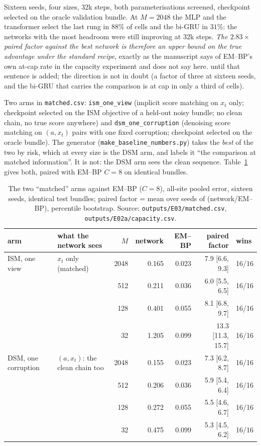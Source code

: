  Sixteen seeds, four sizes, 32k steps, both parameterisations screened, checkpoint selected on the oracle validation bundle. At $M=2048$ the MLP and the transformer select the last rung in $88\%$ of cells and the bi-GRU in $31\%$: the networks with the most headroom were still improving at 32k steps. \emph{The $2.83\times$ paired factor against the best network is therefore an upper bound on the true advantage under the standard recipe}, exactly as the manuscript says of EM--BP's own at-cap rate in the capacity experiment and does not say here.  until that sentence is added; the direction is not in doubt (a factor of three at sixteen seeds, and the bi-GRU that carries the comparison is at cap in only a third of cells).

 Two arms in \texttt{matched.csv}: \texttt{ism\_one\_view} (implicit score matching on $x_t$ only; checkpoint selected on the ISM objective of a held-out noisy bundle; no clean chain, no true score anywhere) and \texttt{dsm\_one\_corruption} (denoising score matching on $(a,x_t)$ pairs with one fixed corruption; checkpoint selected on the oracle bundle). The generator (\texttt{make\_baseline\_numbers.py}) takes the \emph{best} of the two by risk, which at every size is the DSM arm, and labels it ``the comparison at matched information''. It is not: the DSM arm sees the clean sequence. Table~\ref{tab:matched} gives both, paired with EM--BP $C=8$ on identical bundles.

\begin{table}[h]\centering\small
\caption{The two ``matched'' arms against EM--BP ($C=8$), all-site pooled error, sixteen seeds, identical test bundles; paired factor = mean over seeds of (network/EM--BP), percentile bootstrap. Source: \texttt{outputs/E03/matched.csv}, \texttt{outputs/E02a/capacity.csv}.}
\label{tab:matched}
\begin{tabular}{@{}llrrrrl@{}}
\toprule
arm & what the network sees & $M$ & network & EM--BP & paired factor & wins \\
\midrule
ISM, one view & $x_t$ only (matched) & 2048 & 0.165 & 0.023 & 7.9 [6.6, 9.3] & 16/16 \\
 & & 512 & 0.211 & 0.036 & 6.0 [5.5, 6.5] & 16/16 \\
 & & 128 & 0.401 & 0.055 & 8.1 [6.8, 9.7] & 16/16 \\
 & & 32 & 1.205 & 0.099 & 13.3 [11.3, 15.7] & 16/16 \\
DSM, one corruption & $(a, x_t)$: the clean chain too & 2048 & 0.155 & 0.023 & 7.3 [6.2, 8.7] & 16/16 \\
 & & 512 & 0.206 & 0.036 & 5.9 [5.4, 6.4] & 16/16 \\
 & & 128 & 0.272 & 0.055 & 5.5 [4.6, 6.7] & 16/16 \\
 & & 32 & 0.475 & 0.099 & 5.3 [4.5, 6.2] & 16/16 \\
\bottomrule
\end{tabular}
\end{table}

